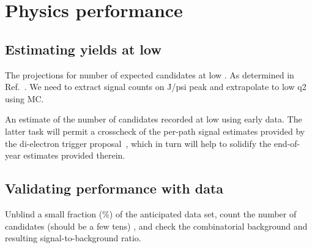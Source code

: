 \clearpage
\section{Physics performance}
\label{sec:performance}



\subsection{Estimating \texorpdfstring{\bkee}{BToKee} yields at low \texorpdfstring{\qsq}{q2}}
\label{sec:estimates}

The projections for number of expected candidates at low \qsq. As
determined in Ref.~\cite{AN-21-160}. We need to extract signal counts
on J/psi peak and extrapolate to low q2 using MC.

An estimate of the number of candidates recorded at low \qsq using
early data. The latter task will permit a crosscheck of the per-path
signal \axe estimates provided by the di-electron trigger
proposal~\cite{AN-21-160}, which in turn will help to solidify the
end-of-year estimates provided therein.

\subsection{Validating performance with data}
\label{sec:yields}

Unblind a small fraction (\%) of the anticipated data set, count
the number of \bkee candidates (should be a few tens) \qsq, and check
the combinatorial background and resulting signal-to-background
ratio. 

